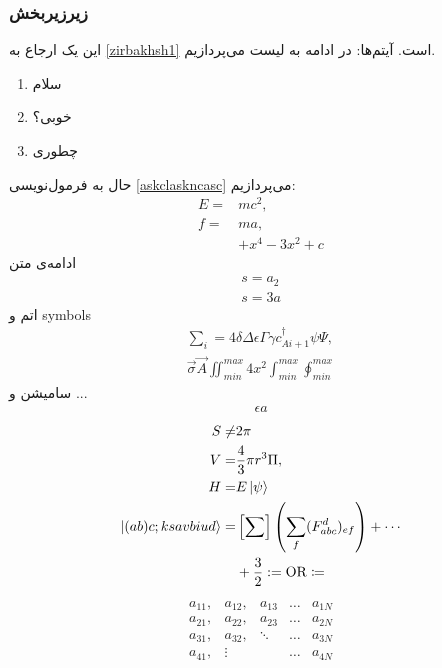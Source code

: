 \subsubsection{زیرزیربخش}
این یک ارجاع به 
\ref{zirbakhsh1} 
است.
آیتم‌ها: 
در ادامه به لیست می‌پردازیم.
\begin{enumerate}
\item[الف:] 
سلام
\item 
خوبی؟
\item 
چطوری
\end{enumerate}
حال به فرمول‌نویسی
 \ref{askclaskncasc} می‌پردازیم:
\begin{equation}\label{askclaskncasc}
\begin{aligned}
E=& mc^2,\\
f=& ma,\\
& +x^4-3x^2+c
\end{aligned}
\end{equation}
ادامه‌ی متن
\begin{align}
s=a_{2} \nonumber\\
s = 3a
\end{align}
اتم و symbols
\begin{equation}\label{ffgc}
	\begin{aligned}
		\sum_{i} = 4 \delta \Delta \epsilon \Gamma \gamma c^{\dagger}_{Ai+1}
		\psi \Psi, \\ \vec{\sigma} \vec{A}
		\iint_{min}^{max} 4x^2
		\int_{min}^{max}
		\oint_{min}^{max}
	\end{aligned}
\end{equation}
سامیشن و ...
\begin{equation}\label{sjdhcbds}
	\begin{aligned}
	\epsilon a
	\end{aligned}
\end{equation}
\begin{equation}\label{ffgc}
	\begin{aligned}
		S \neq &  2\pi\\
		V =& \frac{4}{3} \pi r^3 \Pi,
		\\
		H = & E \ket{\psi} \\
		\ket{(ab) c;ksavbiud} =& \left[\sum\right]\left(\sum_{f}^{} (F^{d}_{abc})_{ef} \right) + \cdots \\
		&+ \frac{3}{2} := \mathrm{OR} \coloneq 
	\end{aligned}
\end{equation}
\begin{equation}
\begin{aligned}
	\begin{matrix}
		a_{11}, & a_{12}, & a_{13}& \ldots & a_{1N}\\
		a_{21}, & a_{22}, & a_{23}& \ldots & a_{2N}\\
		a_{31}, & a_{32}, & \ddots& \ldots & a_{3N}\\
		a_{41}, & \vdots && \ldots & a_{4N}\\
	\end{matrix}
\end{aligned}
\end{equation}
